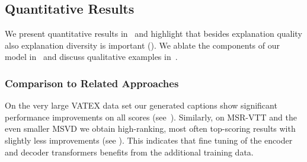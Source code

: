 \documentclass[runningheads,table]{llncs}
\begin{document}
\subsection{Quantitative Results}
We present quantitative results in~ and highlight that besides explanation quality also explanation diversity is important (). We ablate the components of our model in~ and discuss qualitative examples in~.


\subsubsection{Comparison to Related Approaches}
On the very large VATEX data set our generated captions show significant performance improvements on all scores (see~). Similarly, on MSR-VTT and the even smaller MSVD we obtain high-ranking, most often top-scoring results with slightly less improvements (see ). This indicates that fine tuning of the encoder and decoder transformers benefits from the additional training data. 
\end{document}
